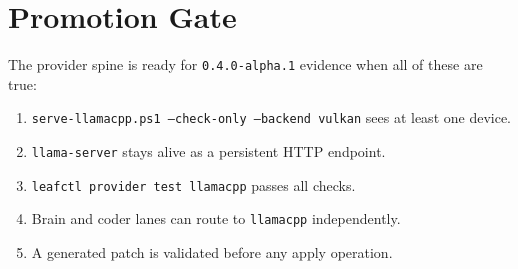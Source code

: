 \documentclass[11pt]{article}
\newcommand{\code}[1]{\texttt{#1}}
\begin{document}
\section*{Promotion Gate}

The provider spine is ready for \code{0.4.0-alpha.1} evidence when all of these
are true:

\begin{enumerate}
  \item \code{serve-llamacpp.ps1 --check-only --backend vulkan} sees at least one device.
  \item \code{llama-server} stays alive as a persistent HTTP endpoint.
  \item \code{leafctl provider test llamacpp} passes all checks.
  \item Brain and coder lanes can route to \code{llamacpp} independently.
  \item A generated patch is validated before any apply operation.
\end{enumerate}
\end{document}
